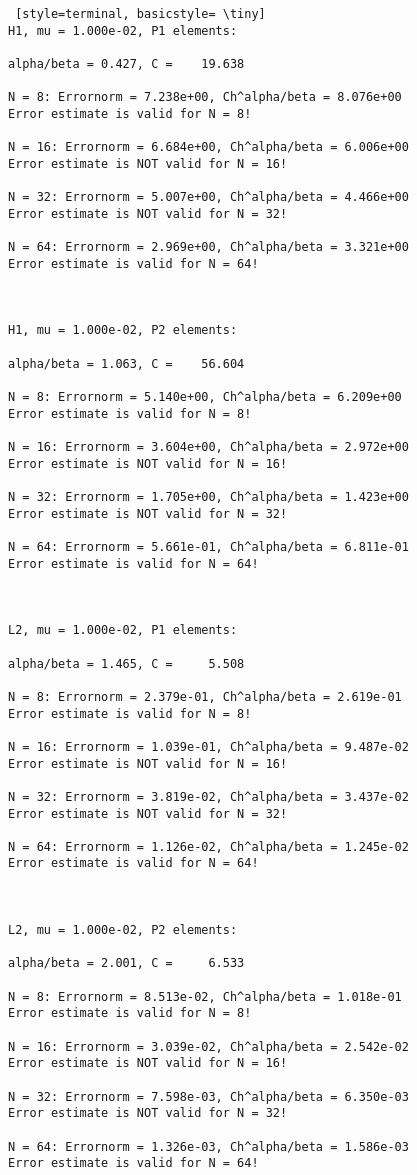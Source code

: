 \documentclass[a4paper,english,12pt,twoside]{article}
\begin{document}
\begin{lstlisting} [style=terminal, basicstyle= \tiny]
H1, mu = 1.000e-02, P1 elements:

alpha/beta = 0.427, C =    19.638

N = 8: Errornorm = 7.238e+00, Ch^alpha/beta = 8.076e+00
Error estimate is valid for N = 8!

N = 16: Errornorm = 6.684e+00, Ch^alpha/beta = 6.006e+00
Error estimate is NOT valid for N = 16!

N = 32: Errornorm = 5.007e+00, Ch^alpha/beta = 4.466e+00
Error estimate is NOT valid for N = 32!

N = 64: Errornorm = 2.969e+00, Ch^alpha/beta = 3.321e+00
Error estimate is valid for N = 64!



H1, mu = 1.000e-02, P2 elements:

alpha/beta = 1.063, C =    56.604

N = 8: Errornorm = 5.140e+00, Ch^alpha/beta = 6.209e+00
Error estimate is valid for N = 8!

N = 16: Errornorm = 3.604e+00, Ch^alpha/beta = 2.972e+00
Error estimate is NOT valid for N = 16!

N = 32: Errornorm = 1.705e+00, Ch^alpha/beta = 1.423e+00
Error estimate is NOT valid for N = 32!

N = 64: Errornorm = 5.661e-01, Ch^alpha/beta = 6.811e-01
Error estimate is valid for N = 64!



L2, mu = 1.000e-02, P1 elements:

alpha/beta = 1.465, C =     5.508

N = 8: Errornorm = 2.379e-01, Ch^alpha/beta = 2.619e-01
Error estimate is valid for N = 8!

N = 16: Errornorm = 1.039e-01, Ch^alpha/beta = 9.487e-02
Error estimate is NOT valid for N = 16!

N = 32: Errornorm = 3.819e-02, Ch^alpha/beta = 3.437e-02
Error estimate is NOT valid for N = 32!

N = 64: Errornorm = 1.126e-02, Ch^alpha/beta = 1.245e-02
Error estimate is valid for N = 64!



L2, mu = 1.000e-02, P2 elements:

alpha/beta = 2.001, C =     6.533

N = 8: Errornorm = 8.513e-02, Ch^alpha/beta = 1.018e-01
Error estimate is valid for N = 8!

N = 16: Errornorm = 3.039e-02, Ch^alpha/beta = 2.542e-02
Error estimate is NOT valid for N = 16!

N = 32: Errornorm = 7.598e-03, Ch^alpha/beta = 6.350e-03
Error estimate is NOT valid for N = 32!

N = 64: Errornorm = 1.326e-03, Ch^alpha/beta = 1.586e-03
Error estimate is valid for N = 64!
\end{lstlisting}
\end{document}
